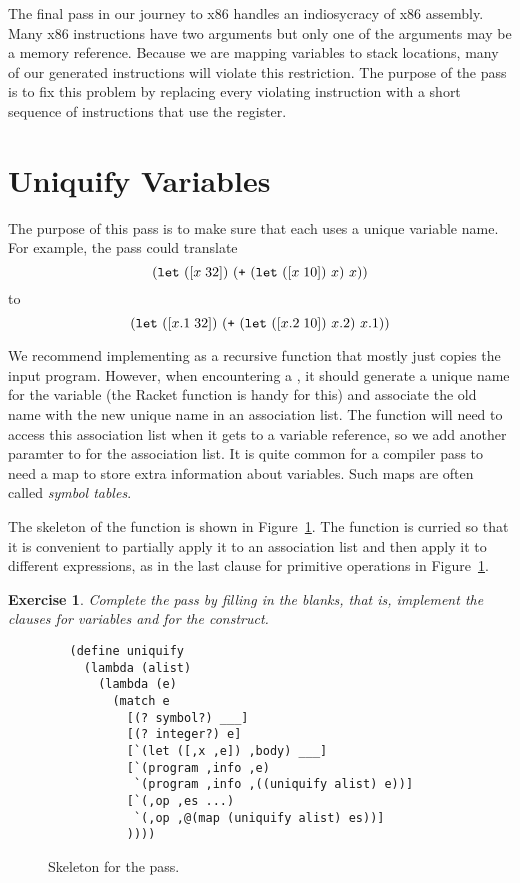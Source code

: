 \documentclass[12pt]{book}
\newtheorem{exercise}[theorem]{Exercise}
\begin{document}
The final pass in our journey to x86 handles an indiosycracy of x86
assembly. Many x86 instructions have two arguments but only one of the
arguments may be a memory reference. Because we are mapping variables
to stack locations, many of our generated instructions will violate
this restriction. The purpose of the  pass
is to fix this problem by replacing every violating instruction with a
short sequence of instructions that use the  register.

\section{Uniquify Variables}
\label{sec:uniquify-s0}

The purpose of this pass is to make sure that each  uses a
unique variable name. For example, the  pass could
translate
\[
(\texttt{let}~([x\;32])~ (\texttt{+}~ (\texttt{let}~([x\;10])~x) ~ x ) )
\]
to
\[
(\texttt{let}~([x.1\;32])~ (\texttt{+}~ (\texttt{let}~([x.2\;10])~x.2) ~ x.1 ) )
\]

We recommend implementing  as a recursive function that
mostly just copies the input program. However, when encountering a
, it should generate a unique name for the variable (the
Racket function  is handy for this) and associate the old
name with the new unique name in an association list. The
 function will need to access this association list when
it gets to a variable reference, so we add another paramter to
 for the association list. It is quite common for a
compiler pass to need a map to store extra information about
variables. Such maps are often called \emph{symbol tables}.

The skeleton of the  function is shown in
Figure~\ref{fig:uniquify-s0}.  The function is curried so that it is
convenient to partially apply it to an association list and then apply
it to different expressions, as in the last clause for primitive
operations in Figure~\ref{fig:uniquify-s0}.

\begin{exercise}
\normalfont %
Complete the  pass by filling in the blanks, that is,
implement the clauses for variables and for the  construct.
\end{exercise}

\begin{figure}[tbp]
\begin{lstlisting}
   (define uniquify
     (lambda (alist)
       (lambda (e)
         (match e
           [(? symbol?) ___]
           [(? integer?) e]
           [`(let ([,x ,e]) ,body) ___]
           [`(program ,info ,e)
            `(program ,info ,((uniquify alist) e))]
           [`(,op ,es ...)
            `(,op ,@(map (uniquify alist) es))]
           ))))
\end{lstlisting}
\caption{Skeleton for the  pass.}
\label{fig:uniquify-s0}
\end{figure}
\end{document}
